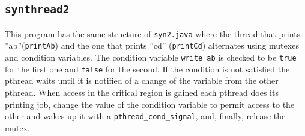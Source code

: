 \subsection{\texttt{synthread2}}
This program has the same structure of \texttt{syn2.java} where the thread that prints ''ab''(\texttt{printAb}) and the one that prints ''cd\n'' (\texttt{printCd}) alternates using mutexes and condition variables. The condition variable \texttt{write_ab} is checked to be \texttt{true} for the first one and \texttt{false} for the second. If the condition is not satisfied the pthread waits until it is notified of a change of the variable from the other pthread. When access in the critical region is gained each pthread does its printing job, change the value of the condition variable to permit access to the other and wakes up it with a \texttt{pthread_cond_signal}, and, finally, release the mutex.

\clearpage



